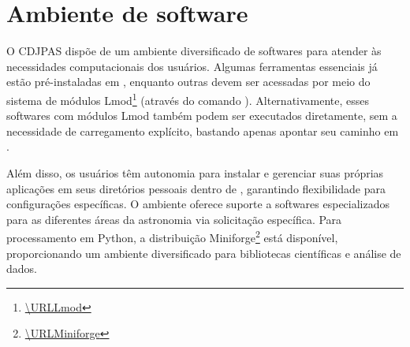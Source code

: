 \section{Ambiente de software}
\label{sec:ambiente-de-software}

O CDJPAS dispõe de um ambiente diversificado de softwares para atender às necessidades computacionais dos usuários. Algumas ferramentas essenciais já estão pré-instaladas em , enquanto outras devem ser acessadas por meio do sistema de módulos Lmod\footnote{\url{\URLLmod}} (através do comando ). Alternativamente, esses softwares com módulos Lmod também podem ser executados diretamente, sem a necessidade de carregamento explícito, bastando apenas apontar seu caminho em .

Além disso, os usuários têm autonomia para instalar e gerenciar suas próprias aplicações em seus diretórios pessoais dentro de , garantindo flexibilidade para configurações específicas. O ambiente oferece suporte a softwares especializados para as diferentes áreas da astronomia via solicitação específica. Para processamento em Python, a distribuição Miniforge\footnote{\url{\URLMiniforge}} está disponível, proporcionando um ambiente diversificado para bibliotecas científicas e análise de dados.
